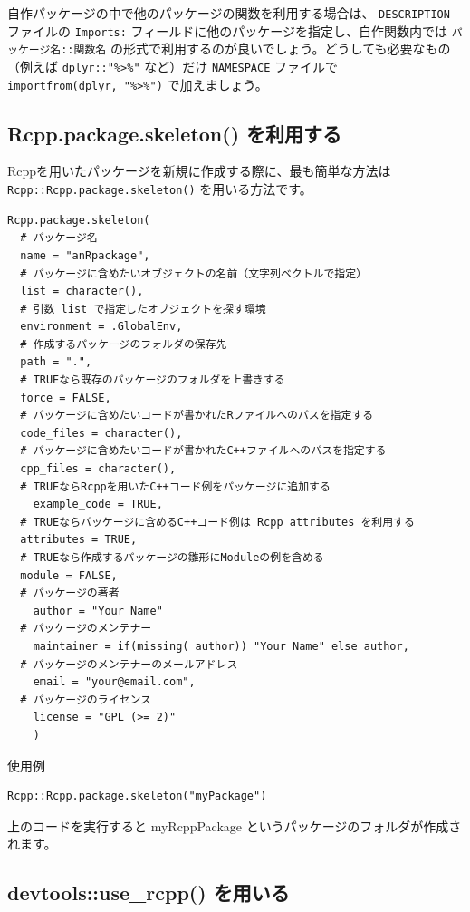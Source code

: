 \documentclass[]{book}
\begin{document}
自作パッケージの中で他のパッケージの関数を利用する場合は、 \texttt{DESCRIPTION} ファイルの \texttt{Imports:} フィールドに他のパッケージを指定し、自作関数内では \texttt{パッケージ名::関数名} の形式で利用するのが良いでしょう。どうしても必要なもの（例えば \texttt{dplyr::"\%\textgreater{}\%"} など）だけ \texttt{NAMESPACE} ファイルで \texttt{importfrom(dplyr,\ "\%\textgreater{}\%")} で加えましょう。

\hypertarget{rcpp.package.skeleton-}{%
\subsection{Rcpp.package.skeleton() を利用する}\label{rcpp.package.skeleton-}}

Rcppを用いたパッケージを新規に作成する際に、最も簡単な方法は \texttt{Rcpp::Rcpp.package.skeleton()} を用いる方法です。

\begin{verbatim}
Rcpp.package.skeleton(
  # パッケージ名
  name = "anRpackage",
  # パッケージに含めたいオブジェクトの名前（文字列ベクトルで指定）
  list = character(),
  # 引数 list で指定したオブジェクトを探す環境
  environment = .GlobalEnv,
  # 作成するパッケージのフォルダの保存先
  path = ".",
  # TRUEなら既存のパッケージのフォルダを上書きする
  force = FALSE,
  # パッケージに含めたいコードが書かれたRファイルへのパスを指定する
  code_files = character(),
  # パッケージに含めたいコードが書かれたC++ファイルへのパスを指定する
  cpp_files = character(),
  # TRUEならRcppを用いたC++コード例をパッケージに追加する
    example_code = TRUE,
  # TRUEならパッケージに含めるC++コード例は Rcpp attributes を利用する
  attributes = TRUE,
  # TRUEなら作成するパッケージの雛形にModuleの例を含める
  module = FALSE,
  # パッケージの著者
    author = "Your Name"
  # パッケージのメンテナー
    maintainer = if(missing( author)) "Your Name" else author,
  # パッケージのメンテナーのメールアドレス
    email = "your@email.com",
  # パッケージのライセンス
    license = "GPL (>= 2)"
    )
\end{verbatim}

使用例

\begin{verbatim}
Rcpp::Rcpp.package.skeleton("myPackage")
\end{verbatim}

上のコードを実行すると myRcppPackage というパッケージのフォルダが作成されます。

\hypertarget{devtoolsuse_rcpp-}{%
\subsection{devtools::use\_rcpp() を用いる}\label{devtoolsuse_rcpp-}}
\end{document}
